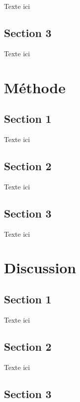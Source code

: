 \documentclass[9pt,twocolumn,twoside,]{pnas-new}
\begin{document}
Texte ici

\hypertarget{section-3}{%
\subsection{Section 3}\label{section-3}}

Texte ici

\hypertarget{muxe9thode}{%
\section{Méthode}\label{muxe9thode}}

\hypertarget{section-1-1}{%
\subsection{Section 1}\label{section-1-1}}

Texte ici

\hypertarget{section-2-1}{%
\subsection{Section 2}\label{section-2-1}}

Texte ici

\hypertarget{section-3-1}{%
\subsection{Section 3}\label{section-3-1}}

Texte ici

\hypertarget{discussion}{%
\section{Discussion}\label{discussion}}

\hypertarget{section-1-2}{%
\subsection{Section 1}\label{section-1-2}}

Texte ici

\hypertarget{section-2-2}{%
\subsection{Section 2}\label{section-2-2}}

Texte ici

\hypertarget{section-3-2}{%
\subsection{Section 3}\label{section-3-2}}
\end{document}
